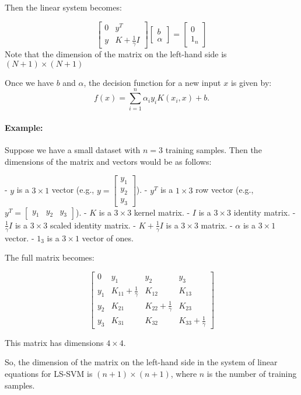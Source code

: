 Then the linear system becomes:

\[
\begin{bmatrix}
0 & y^T \\
y & K + \frac{1}{\gamma} I
\end{bmatrix}
\begin{bmatrix}
b \\
\alpha
\end{bmatrix}
=
\begin{bmatrix}
0 \\
1_n
\end{bmatrix}
\]
Note that the dimension of the matrix on the left-hand side is $(N+1)\times (N+1)$

Once we have \( b \) and \( \alpha \), the decision function for a new input \( x \) is given by:
\[
f(x) = \sum_{i=1}^n \alpha_i y_i K(x_i, x) + b.
\]

\paragraph{Example: }Suppose we have a small dataset with \( n = 3 \) training samples. Then the dimensions of the matrix and vectors would be as follows:

- \( y \) is a \( 3 \times 1 \) vector (e.g., \( y = \begin{bmatrix} y_1 \\ y_2 \\ y_3 \end{bmatrix} \)).
- \( y^T \) is a \( 1 \times 3 \) row vector (e.g., \( y^T = \begin{bmatrix} y_1 & y_2 & y_3 \end{bmatrix} \)).
- \( K \) is a \( 3 \times 3 \) kernel matrix.
- \( I \) is a \( 3 \times 3 \) identity matrix.
- \( \frac{1}{\gamma} I \) is a \( 3 \times 3 \) scaled identity matrix.
- \( K + \frac{1}{\gamma} I \) is a \( 3 \times 3 \) matrix.
- \( \alpha \) is a \( 3 \times 1 \) vector.
- \( 1_3 \) is a \( 3 \times 1 \) vector of ones.

The full matrix becomes:

\[
\begin{bmatrix}
0 & y_1 & y_2 & y_3 \\
y_1 & K_{11} + \frac{1}{\gamma} & K_{12} & K_{13} \\
y_2 & K_{21} & K_{22} + \frac{1}{\gamma} & K_{23} \\
y_3 & K_{31} & K_{32} & K_{33} + \frac{1}{\gamma}
\end{bmatrix}
\]

This matrix has dimensions \( 4 \times 4 \).

So, the dimension of the matrix on the left-hand side in the system of linear equations for LS-SVM is \( (n + 1) \times (n + 1) \), where \( n \) is the number of training samples.
